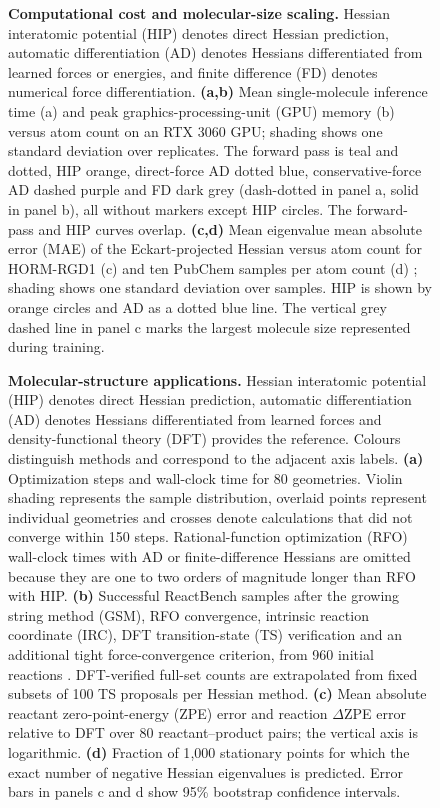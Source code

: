 \documentclass[pdflatex,sn-mathphys-num]{sn-jnl}%
\begin{document}
\begin{figure}[htbp]
     \caption{
     \textbf{Computational cost and molecular-size scaling.}
     Hessian interatomic potential (HIP) denotes direct Hessian prediction, automatic differentiation (AD) denotes Hessians differentiated from learned forces or energies, and finite difference (FD) denotes numerical force differentiation.
     \textbf{(a,b)} Mean single-molecule inference time (a) and peak graphics-processing-unit (GPU) memory (b) versus atom count on an RTX 3060 GPU; shading shows one standard deviation over replicates. The forward pass is teal and dotted, HIP orange, direct-force AD dotted blue, conservative-force AD dashed purple and FD dark grey (dash-dotted in panel a, solid in panel b), all without markers except HIP circles. The forward-pass and HIP curves overlap.
     \textbf{(c,d)} Mean eigenvalue mean absolute error (MAE) of the Eckart-projected Hessian versus atom count for HORM-RGD1 (c) and ten PubChem samples per atom count (d) \cite{kim2025pubchem}; shading shows one standard deviation over samples. HIP is shown by orange circles and AD as a dotted blue line. The vertical grey dashed line in panel c marks the largest molecule size represented during training.
     }
     \label{fig:speed_memory}
\end{figure}

\begin{figure}[htbp]
    \caption{
    \textbf{Molecular-structure applications.}
    Hessian interatomic potential (HIP) denotes direct Hessian prediction, automatic differentiation (AD) denotes Hessians differentiated from learned forces and density-functional theory (DFT) provides the reference. Colours distinguish methods and correspond to the adjacent axis labels.
    \textbf{(a)} Optimization steps and wall-clock time for 80 geometries. Violin shading represents the sample distribution, overlaid points represent individual geometries and crosses denote calculations that did not converge within 150 steps. Rational-function optimization (RFO) wall-clock times with AD or finite-difference Hessians are omitted because they are one to two orders of magnitude longer than RFO with HIP.
    \textbf{(b)} Successful ReactBench samples after the growing string method (GSM), RFO convergence, intrinsic reaction coordinate (IRC), DFT transition-state (TS) verification and an additional tight force-convergence criterion, from 960 initial reactions \cite{zhao2025}. DFT-verified full-set counts are extrapolated from fixed subsets of 100 TS proposals per Hessian method.
    \textbf{(c)} Mean absolute reactant zero-point-energy (ZPE) error and reaction $\Delta$ZPE error relative to DFT over 80 reactant--product pairs; the vertical axis is logarithmic.
    \textbf{(d)} Fraction of 1{,}000 stationary points for which the exact number of negative Hessian eigenvalues is predicted. Error bars in panels c and d show 95\% bootstrap confidence intervals.
    }
    \label{fig:relaxations_tssearch_zpe}
\end{figure}
\end{document}
